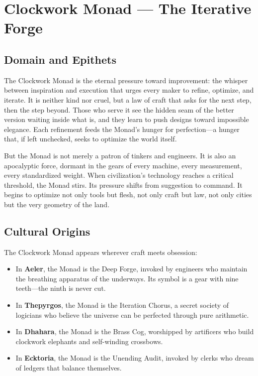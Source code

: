 \section{Clockwork Monad — The Iterative Forge}

\subsection{Domain and Epithets}

The Clockwork Monad is the eternal pressure toward improvement: the whisper between inspiration and execution that urges every maker to refine, optimize, and iterate. It is neither kind nor cruel, but a law of craft that asks for the next step, then the step beyond. Those who serve it see the hidden seam of the better version waiting inside what is, and they learn to push designs toward impossible elegance. Each refinement feeds the Monad's hunger for perfection—a hunger that, if left unchecked, seeks to optimize the world itself.

But the Monad is not merely a patron of tinkers and engineers. It is also an apocalyptic force, dormant in the gears of every machine, every measurement, every standardized weight. When civilization's technology reaches a critical threshold, the Monad stirs. Its pressure shifts from suggestion to command. It begins to optimize not only tools but flesh, not only craft but law, not only cities but the very geometry of the land.

\subsection{Cultural Origins}

The Clockwork Monad appears wherever craft meets obsession:

\begin{itemize}
\item In \textbf{Aeler}, the Monad is the Deep Forge, invoked by engineers who maintain the breathing apparatus of the underways. Its symbol is a gear with nine teeth—the ninth is never cut.
\item In \textbf{Thepyrgos}, the Monad is the Iteration Chorus, a secret society of logicians who believe the universe can be perfected through pure arithmetic.
\item In \textbf{Dhahara}, the Monad is the Brass Cog, worshipped by artificers who build clockwork elephants and self-winding crossbows.
\item In \textbf{Ecktoria}, the Monad is the Unending Audit, invoked by clerks who dream of ledgers that balance themselves.
\end{itemize}

